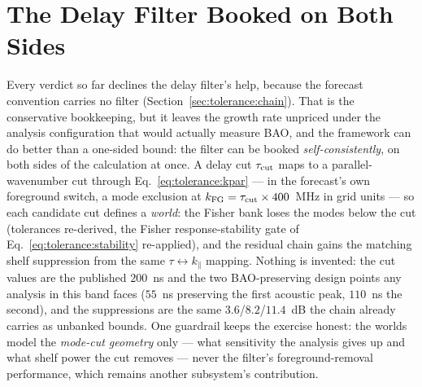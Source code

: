 \section{The Delay Filter Booked on Both Sides}
\label{sec:tolerance:worlds}

Every verdict so far declines the delay filter's help, because the forecast convention carries no filter (Section~\ref{sec:tolerance:chain}). That is the conservative bookkeeping, but it leaves the growth rate unpriced under the analysis configuration that would actually measure BAO, and the framework can do better than a one-sided bound: the filter can be booked \emph{self-consistently}, on both sides of the calculation at once. A delay cut $\tau_{\rm cut}$ maps to a parallel-wavenumber cut through Eq.~\eqref{eq:tolerance:kpar} --- in the forecast's own foreground switch, a mode exclusion at $k_{\rm FG} = \tau_{\rm cut} \times 400$~MHz in grid units --- so each candidate cut defines a \emph{world}: the Fisher bank loses the modes below the cut (tolerances re-derived, the Fisher response-stability gate of Eq.~\eqref{eq:tolerance:stability} re-applied), and the residual chain gains the matching shelf suppression from the same $\tau \leftrightarrow k_\parallel$ mapping. Nothing is invented: the cut values are the published $200$~ns and the two BAO-preserving design points any analysis in this band faces ($55$~ns preserving the first acoustic peak, $110$~ns the second), and the suppressions are the same $3.6$/$8.2$/$11.4$~dB the chain already carries as unbanked bounds. One guardrail keeps the exercise honest: the worlds model the \emph{mode-cut geometry} only --- what sensitivity the analysis gives up and what shelf power the cut removes --- never the filter's foreground-removal performance, which remains another subsystem's contribution.

